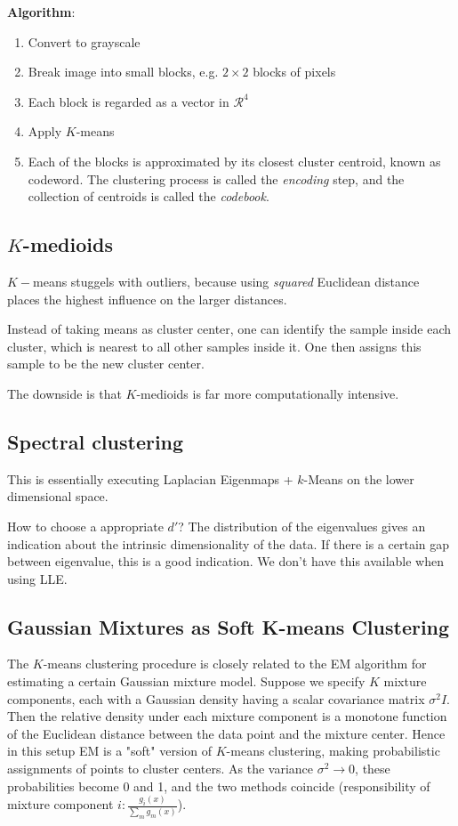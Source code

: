 \textbf{Algorithm}:
\begin{enumerate}
    \item Convert to grayscale
    \item Break image into small blocks, e.g. \(2 \times 2\) blocks of pixels
    \item Each block is regarded as a vector in \(\mathcal{R}^4\)
    \item Apply \(K\)-means
    \item Each of the blocks is approximated by its closest cluster centroid, known as codeword. The clustering process is called the \textit{encoding} step, and the collection of centroids is called the \textit{codebook}.
\end{enumerate}

\subsection*{\(K\)-medioids}
 \(K-\)means stuggels with outliers, because using \textit{squared} Euclidean distance places the highest influence on the larger distances.

 Instead of taking means as cluster center, one can identify the sample inside each cluster, which is nearest to all other samples inside it. One then assigns this sample to be the new cluster center.

 The downside is that \(K\)-medioids is far more computationally intensive.

\subsection*{Spectral clustering}
This is essentially executing Laplacian Eigenmaps + \(k\)-Means on the lower dimensional space.

How to choose a appropriate \(d'\)? The distribution of the eigenvalues gives an indication about the intrinsic dimensionality of the data. If there is a certain gap between eigenvalue, this is a good indication. We don't have this available when using LLE.

\subsection*{Gaussian Mixtures as Soft K-means Clustering}
The \(K\)-means clustering procedure is closely related to the EM algorithm for estimating a certain Gaussian mixture model. Suppose we specify \(K\) mixture components, each with a Gaussian density having a scalar covariance matrix \(\sigma^2 I\). Then the relative density under each mixture component is a monotone function of the Euclidean distance between the data point and the mixture center. Hence in this setup EM is a "soft" version of \(K\)-means clustering, making probabilistic assignments of points to cluster centers. As the variance \(\sigma^2 \rightarrow 0\), these probabilities become 0 and 1, and the two methods coincide (responsibility of mixture component \(i: \frac{g_i(x)}{\sum_m g_m(x)}\)).


